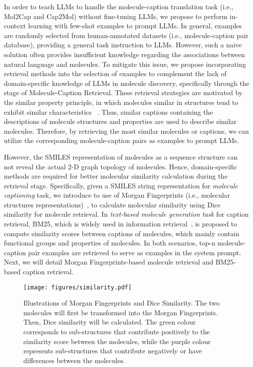 \documentclass{article}
\theoremstyle{plain}
\theoremstyle{definition}
\theoremstyle{remark}
\begin{document}
In order to teach LLMs to handle the molecule-caption translation task (i.e., Mol2Cap and Cap2Mol) without fine-tuning LLMs, we propose to perform in-context learning with few-shot examples to prompt LLMs.
In general,  examples are randomly selected from human-annotated datasets (i.e., molecule-caption pair database), providing a general task instruction to LLMs. 
However, such a naive solution often provides insufficient knowledge regarding the associations between natural language and molecules.
To mitigate this issue, we propose incorporating retrieval methods into the selection of examples to complement the lack of domain-specific knowledge of LLMs in molecule discovery, specifically through the stage of Molecule-Caption Retrieval.
These retrieval strategies are motivated by the similar property principle, in which molecules similar in structures tend to exhibit similar characteristics ~\cite{wang2016improving}.
Thus, similar captions containing the descriptions of molecule structures and properties are used to describe similar molecules.
Therefore, by retrieving the most similar molecules or captions, we can utilize the corresponding molecule-caption pairs as examples to prompt LLMs. 


However, the SMILES representation of molecules as a sequence structure can not reveal the actual 2-D graph topology of molecules. Hence, domain-specific methods are required for better molecular similarity calculation during the retrieval stage.
Specifically, given a SMILES string representation for \emph{molecule captioning} task, we introduce to use of Morgan Fingerprints (i.e., molecular structures representations)~\cite{butina1999unsupervised}, to calculate molecular similarity using Dice similarity for molecule retrieval.
In \emph{text-based molecule generation task} for caption retrieval, BM25, which is widely used in information retrieval~\cite{robertson2009probabilistic}, is proposed to compute similarity scores between captions of molecules, which mainly contain functional groups and properties of molecules. 
In both scenarios, top-n molecule-caption pair examples are retrieved to serve as examples in the system prompt.
Next, we will detail Morgan Fingerprints-based molecule retrieval and BM25-based caption retrieval.



\begin{figure}[t]
    \centering
    \texttt{[image: figures/similarity.pdf]}
    \caption{Illustrations of Morgan Fingerprints and Dice Similarity. 
    The two molecules will first be transformed into the Morgan Fingerprints. Then, Dice similarity will be calculated.
    The green colour corresponds to sub-structures that contribute positively to the similarity score between the molecules, 
    while the purple colour represents sub-structures that contribute negatively or have differences between the molecules. 
    }
    \label{fig:similarity}
\end{figure}
\end{document}
